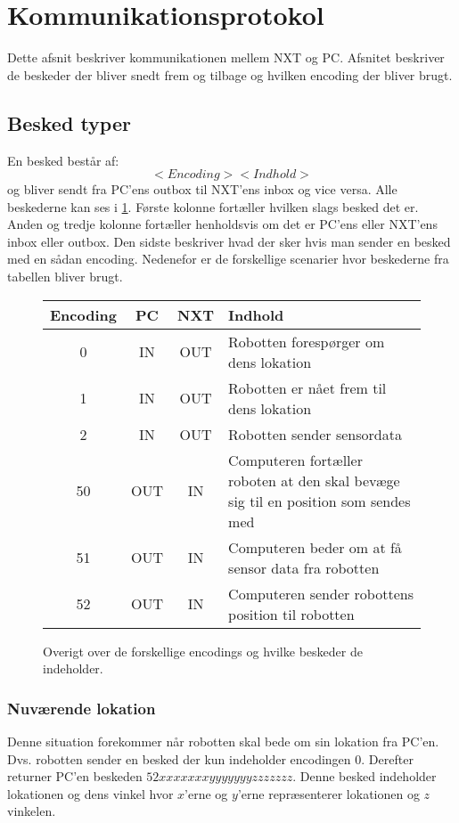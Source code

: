 \section{Kommunikationsprotokol}
Dette afsnit beskriver kommunikationen mellem NXT og PC.
Afsnitet beskriver de beskeder der bliver snedt frem og tilbage og hvilken encoding der bliver brugt.

\subsection{Besked typer}
En besked består af:
\begin{equation}
<Encoding><Indhold>
\end{equation}
og bliver sendt fra PC'ens outbox til NXT'ens inbox og vice versa.
Alle beskederne kan ses i \cref{design:protokol_tabel}.
Første kolonne fortæller hvilken slags besked det er.
Anden og tredje kolonne fortæller henholdsvis om det er PC'ens eller NXT'ens inbox eller outbox.
Den sidste beskriver hvad der sker hvis man sender en besked med en sådan encoding.
Nedenefor er de forskellige scenarier hvor beskederne fra tabellen bliver brugt.

\begin{figure}[H]
\begin{longtable}{ c | c | c | p{}}
Encoding & PC & NXT & Indhold\\
\hline
\hline
0 & IN & OUT & Robotten forespørger om dens lokation \\
1 & IN & OUT & Robotten er nået frem til dens lokation \\
2 & IN & OUT & Robotten sender sensordata \\
50 & OUT & IN & Computeren fortæller roboten at den skal bevæge sig til en position som sendes med\\
51 & OUT & IN & Computeren beder om at få sensor data fra robotten \\
52 & OUT & IN & Computeren sender robottens position til robotten \\
\end{longtable}
\label{design:protokol_tabel}
\caption{Overigt over de forskellige encodings og hvilke beskeder de indeholder.}
\end{figure}

\subsubsection{Nuværende lokation}
Denne situation forekommer når robotten skal bede om sin lokation fra PC'en.
Dvs. robotten sender en besked der kun indeholder encodingen $0$.
Derefter returner PC'en beskeden $52xxxxxxxyyyyyyyzzzzzzz$.
Denne besked indeholder lokationen og dens vinkel hvor $x$'erne og $y$'erne repræsenterer lokationen og $z$ vinkelen.

